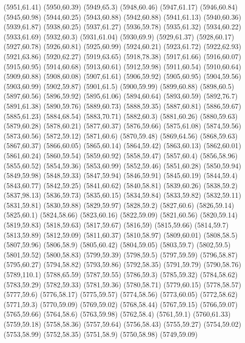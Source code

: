 (5951,61.41)
(5950,60.39)
(5949,65.3)
(5948,60.46)
(5947,61.17)
(5946,60.84)
(5945,60.98)
(5944,60.25)
(5943,60.88)
(5942,60.88)
(5941,61.13)
(5940,60.36)
(5939,61.87)
(5938,60.25)
(5937,61.27)
(5936,59.78)
(5935,61.32)
(5934,60.22)
(5933,61.69)
(5932,60.3)
(5931,61.04)
(5930,69.9)
(5929,61.37)
(5928,60.17)
(5927,60.78)
(5926,60.81)
(5925,60.99)
(5924,60.21)
(5923,61.72)
(5922,62.93)
(5921,63.86)
(5920,62.27)
(5919,63.65)
(5918,78.38)
(5917,61.66)
(5916,60.07)
(5915,60.95)
(5914,60.68)
(5913,60.61)
(5912,59.98)
(5911,60.54)
(5910,60.64)
(5909,60.88)
(5908,60.08)
(5907,61.61)
(5906,59.92)
(5905,60.95)
(5904,59.56)
(5903,60.99)
(5902,59.87)
(5901,61.5)
(5900,59.99)
(5899,60.88)
(5898,60.5)
(5897,60.56)
(5896,59.92)
(5895,61.06)
(5894,60.64)
(5893,60.59)
(5892,76.7)
(5891,61.38)
(5890,59.76)
(5889,60.73)
(5888,59.35)
(5887,60.81)
(5886,59.67)
(5885,61.23)
(5884,68.54)
(5883,70.71)
(5882,60.3)
(5881,60.26)
(5880,59.63)
(5879,60.28)
(5878,60.21)
(5877,60.37)
(5876,59.66)
(5875,61.08)
(5874,59.56)
(5873,60.56)
(5872,59.12)
(5871,60.6)
(5870,59.48)
(5869,64.56)
(5868,59.63)
(5867,60.37)
(5866,60.05)
(5865,60.14)
(5864,59.42)
(5863,60.13)
(5862,60.01)
(5861,60.24)
(5860,59.54)
(5859,60.92)
(5858,59.47)
(5857,60.4)
(5856,58.96)
(5855,60.52)
(5854,59.36)
(5853,60.99)
(5852,59.46)
(5851,60.28)
(5850,59.94)
(5849,59.98)
(5848,59.33)
(5847,59.94)
(5846,59.91)
(5845,60.19)
(5844,59.4)
(5843,60.77)
(5842,59.25)
(5841,60.62)
(5840,58.81)
(5839,60.26)
(5838,59.2)
(5837,98.13)
(5836,59.73)
(5835,60.15)
(5834,59.84)
(5833,59.82)
(5832,59.11)
(5831,59.81)
(5830,59.88)
(5829,59.97)
(5828,59.2)
(5827,60.6)
(5826,59.14)
(5825,60.1)
(5824,58.66)
(5823,60.16)
(5822,59.09)
(5821,60.56)
(5820,59.14)
(5819,59.83)
(5818,59.63)
(5817,59.67)
(5816,59)
(5815,59.66)
(5814,59.7)
(5813,59.89)
(5812,59.09)
(5811,60.37)
(5810,58.97)
(5809,60.01)
(5808,58.5)
(5807,59.96)
(5806,58.9)
(5805,60.42)
(5804,59.05)
(5803,59.7)
(5802,59.5)
(5801,59.52)
(5800,58.83)
(5799,59.39)
(5798,59.5)
(5797,59.59)
(5796,58.87)
(5795,60.27)
(5794,58.82)
(5793,59.86)
(5792,58.35)
(5791,59.79)
(5790,58.76)
(5789,110.1)
(5788,65.59)
(5787,59.55)
(5786,59.3)
(5785,59.32)
(5784,58.62)
(5783,59.29)
(5782,59.33)
(5781,59.36)
(5780,58.71)
(5779,60.15)
(5778,58.57)
(5777,59.6)
(5776,58.17)
(5775,59.57)
(5774,58.56)
(5773,60.05)
(5772,58.62)
(5771,59.3)
(5770,59.09)
(5769,59.02)
(5768,58.44)
(5767,59.15)
(5766,59.07)
(5765,59.66)
(5764,58.6)
(5763,59.98)
(5762,58.4)
(5761,59.1)
(5760,61.33)
(5759,59.18)
(5758,58.36)
(5757,59.64)
(5756,58.43)
(5755,59.27)
(5754,59.02)
(5753,58.99)
(5752,58.35)
(5751,58.9)
(5750,58.98)
(5749,59.09)
